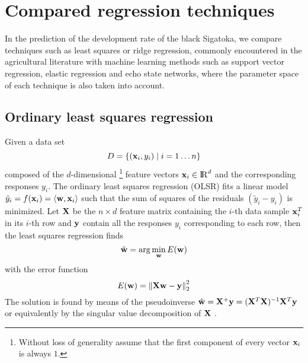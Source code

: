 \section{Compared regression techniques}
\label{sec:techs}

In the prediction of the development rate of the black Sigatoka, we
compare techniques such as least squares or ridge regression, commonly
encountered in the agricultural literature with machine learning
methods such as support vector regression, elastic regression and echo
state networks, where the parameter space of each technique is also
taken into account.

\subsection{Ordinary least squares regression}

Given a data set 
\begin{equation}
  D=\left\{(\mathbf{x}_i,y_i) \mid i=1\ldots n\right\}
\end{equation}
composed of the $d$-dimensional%
\footnote{Without loss of generality assume that the first component
  of every vector $\mathbf{x}_i$ is always $1$.}
%
feature vectors $\mathbf{x}_i\in\mathrm{I\negthinspace R}^d$ and the corresponding responses
$y_i$.
%
The ordinary least squares regression (OLSR) fits a linear model
$\tilde{y}_i = f(\mathbf{x}_i) = \left\langle\mathbf{w},\mathbf{x}_i\right\rangle$ such that the sum of
squares of the residuals $(\tilde{y}_i-y_i)$ is minimized.
%
Let $\mathbf{X}$ be the $n\times{}d$ feature matrix containing the $i$-th
data sample $\mathbf{x}_i^T$ in its $i$-th row and $\mathbf{y}$ contain all
the responses $y_i$ corresponding to each row, then the least squares
regression finds
\begin{equation}
\label{eq:problem}
  \hat{\mathbf{w}} =
  \arg\min_{\mathbf{w}} E(\mathbf{w})
\end{equation}
with the error function
\begin{equation*}
  E(\mathbf{w}) =  \left\| \mathbf{X}\mathbf{w} - \mathbf{y}\right\|_2^2
\end{equation*}
The solution is found by means of the pseudoinverse
$\hat{\mathbf{w}}=\mathbf{X}^+\mathbf{y}=(\mathbf{X}^T\mathbf{X})^{-1}\mathbf{X}^T\mathbf{y}$
or equivalently by the singular value decomposition of $\mathbf{X}$
\citep{Press2007}.


